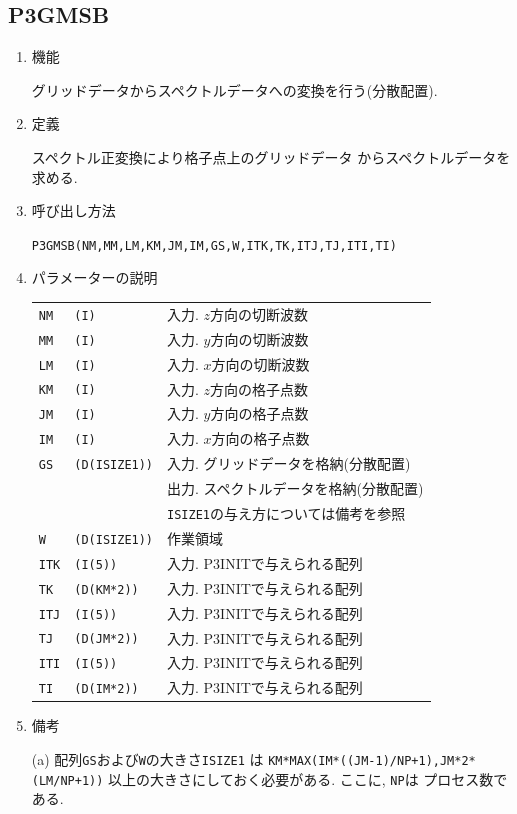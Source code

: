 \documentclass[a4j,fleqn]{jarticle}
\begin{document}

\subsection{P3GMSB}

\begin{enumerate}

\item 機能 

グリッドデータからスペクトルデータへの変換を行う(分散配置).

\item 定義

スペクトル正変換により格子点上のグリッドデータ
からスペクトルデータを求める.

\item 呼び出し方法 

{\tt P3GMSB(NM,MM,LM,KM,JM,IM,GS,W,ITK,TK,ITJ,TJ,ITI,TI)}
  
\item パラメーターの説明

\begin{tabular}{lll}
{\tt NM} & {\tt (I)} & 入力. $z$方向の切断波数\\
{\tt MM} & {\tt (I)} & 入力. $y$方向の切断波数\\
{\tt LM} & {\tt (I)} & 入力. $x$方向の切断波数\\
{\tt KM} & {\tt (I)} & 入力. $z$方向の格子点数\\
{\tt JM} & {\tt (I)} & 入力. $y$方向の格子点数\\
{\tt IM} & {\tt (I)} & 入力. $x$方向の格子点数\\
{\tt GS} & {\tt (D(ISIZE1))} &
                 入力. グリッドデータを格納(分散配置)\\
        &                 &
	         出力. スペクトルデータを格納(分散配置)\\
        &                 &
	         {\tt ISIZE1}の与え方については備考を参照\\
{\tt W} & {\tt (D(ISIZE1))} & 作業領域\\
{\tt ITK} & {\tt (I(5))} & 入力. P3INITで与えられる配列\\
{\tt TK} & {\tt (D(KM*2))} & 入力. P3INITで与えられる配列\\
{\tt ITJ} & {\tt (I(5))} & 入力. P3INITで与えられる配列\\
{\tt TJ} & {\tt (D(JM*2))} & 入力. P3INITで与えられる配列\\
{\tt ITI} & {\tt (I(5))} & 入力. P3INITで与えられる配列\\
{\tt TI} & {\tt (D(IM*2))} & 入力. P3INITで与えられる配列
\end{tabular}

\item 備考

(a) 配列{\tt GS}および{\tt W}の大きさ{\tt ISIZE1}
     は {\tt KM*MAX(IM*((JM-1)/NP+1),JM*2*(LM/NP+1))}
     以上の大きさにしておく必要がある. ここに, {\tt NP}は
     プロセス数である.

\end{enumerate}
\end{document}
